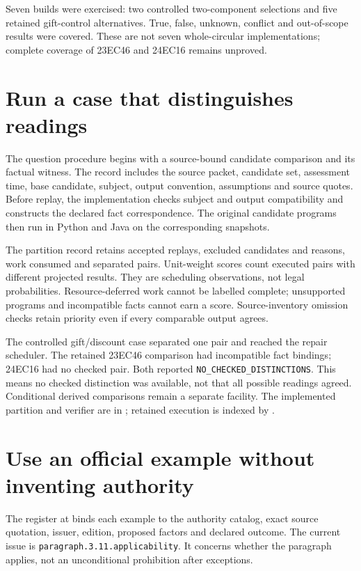 \documentclass[12pt,a4paper,oneside,openany]{book}
\begin{document}
Seven builds were exercised: two controlled two-component selections and five
retained gift-control alternatives. True, false, unknown, conflict and
out-of-scope results were covered. These are not seven whole-circular
implementations; complete coverage of 23EC46 and 24EC16 remains unproved.

\section{Run a case that distinguishes readings}

The question procedure begins with a source-bound candidate comparison and its
factual witness. The record includes the source packet, candidate set, assessment
time, base candidate, subject, output convention, assumptions and source quotes.
Before replay, the implementation checks subject and output compatibility and
constructs the declared fact correspondence. The original candidate programs
then run in Python and Java on the corresponding snapshots.

The partition record retains accepted replays, excluded candidates and reasons,
work consumed and separated pairs. Unit-weight scores count executed pairs
with different projected results. They are scheduling observations, not legal
probabilities. Resource-deferred work cannot be labelled complete; unsupported
programs and incompatible facts cannot earn a score. Source-inventory omission
checks retain priority even if every comparable output agrees.

The controlled gift/discount case separated one pair and reached the repair
scheduler. The retained 23EC46 comparison had incompatible fact bindings;
24EC16 had no checked pair. Both reported \texttt{NO\_CHECKED\_DISTINCTIONS}.
This means no checked distinction was available, not that all possible readings
agreed. Conditional derived comparisons remain a separate facility. The
implemented partition and verifier are in
; retained execution
is indexed by .

\section{Use an official example without inventing authority}

The register at  binds each
example to the authority catalog, exact source quotation, issuer, edition,
proposed factors and declared outcome. The current issue is
\texttt{paragraph.3.11.applicability}. It concerns whether the paragraph applies,
not an unconditional prohibition after exceptions.
\end{document}
